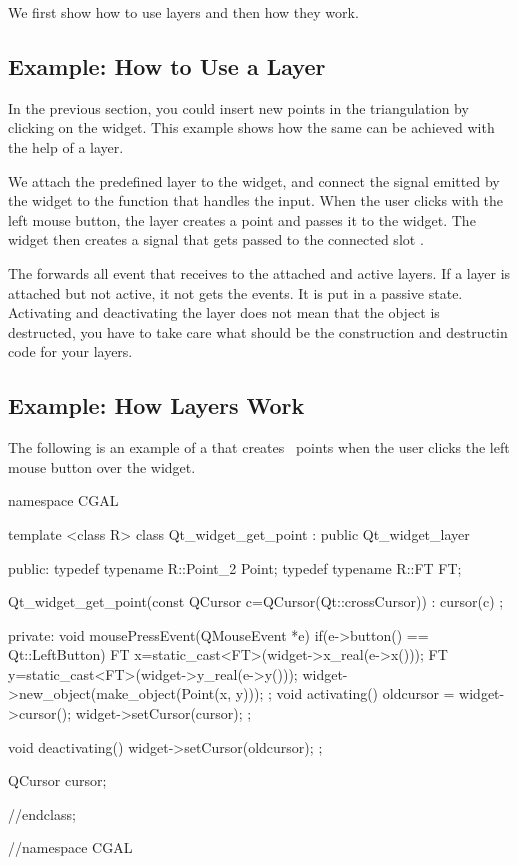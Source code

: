 We first show how to use layers and then how they work.

\subsection{Example: How to Use a Layer}

In the previous section, you could insert new points in the
triangulation by clicking on the widget. This example shows how
the same can be achieved with the help of a layer.

We attach the predefined layer  to the widget,
and connect the signal emitted by the widget to the function that
handles the input.  When the user clicks with the left mouse button,
the layer creates a point and passes it to the widget. The widget then
creates a signal that gets passed to the connected slot
.


The  forwards all event that receives to the
attached and active layers. If a layer is attached but not active, it
not gets the events. It is put in a passive state. Activating and
deactivating the layer does not mean that the object is destructed,
you have to take care what should be the construction and destructin
code for your layers.

\subsection{Example: How Layers Work}

The following is an example of a  that creates \cgal\ points when
the user clicks the left mouse button over the widget. 
 
\begin{ccExampleCode}
namespace CGAL {
template <class R>
class Qt_widget_get_point : public Qt_widget_layer
{
public:
  typedef typename R::Point_2   Point;
  typedef typename R::FT        FT;
  
  Qt_widget_get_point(const QCursor c=QCursor(Qt::crossCursor)) :
    cursor(c) {};
  
private:
  void mousePressEvent(QMouseEvent *e)
  {
    if(e->button() == Qt::LeftButton)
    {
      FT x=static_cast<FT>(widget->x_real(e->x()));
      FT y=static_cast<FT>(widget->y_real(e->y()));
      widget->new_object(make_object(Point(x, y)));
    }
  };
  void activating()
  {
    oldcursor = widget->cursor();
    widget->setCursor(cursor);
  };
  
  void deactivating()
  {
    widget->setCursor(oldcursor);
  };

  QCursor cursor;
}//endclass;
}//namespace CGAL
\end{ccExampleCode}

